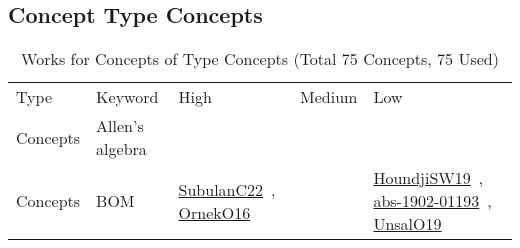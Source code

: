 \clearpage
\subsection{Concept Type Concepts}
\label{sec:Concepts}
\label{Concepts}
{\scriptsize
\begin{longtable}{lp{3cm}>{\raggedright\arraybackslash}p{6cm}>{\raggedright\arraybackslash}p{6cm}>{\raggedright\arraybackslash}p{8cm}}
\rowcolor{white}\caption{Works for Concepts of Type Concepts (Total 75 Concepts, 75 Used)}\\ \toprule
\rowcolor{white}Type & Keyword & High & Medium & Low\\ \midrule\endhead
\bottomrule
\endfoot
\index{Allen's algebra}\index{Concepts!Allen's algebra}Concepts & Allen's algebra &  &  & \\
\index{BOM}\index{Concepts!BOM}Concepts & BOM & \href{../works/SubulanC22.pdf}{SubulanC22}~\cite{SubulanC22}, \href{../works/OrnekO16.pdf}{OrnekO16}~\cite{OrnekO16} &  & \href{../works/HoundjiSW19.pdf}{HoundjiSW19}~\cite{HoundjiSW19}, \href{../works/abs-1902-01193.pdf}{abs-1902-01193}~\cite{abs-1902-01193}, \href{../works/UnsalO19.pdf}{UnsalO19}~\cite{UnsalO19}\\

\end{longtable}}

